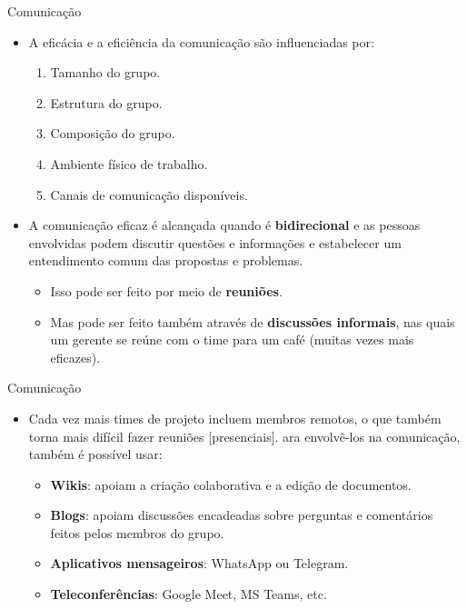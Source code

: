 \documentclass{beamer}
\begin{document}
\begin{frame}{Comunicação}
	\begin{itemize}
		\justifying
		\item<1> A eficácia e a eficiência da comunicação são influenciadas por:
		\begin{enumerate}
			\item<1> Tamanho do grupo.
			\item<1> Estrutura do grupo.
			\item<1> Composição do grupo.
			\item<1> Ambiente físico de trabalho.
			\item<1> Canais de comunicação disponíveis.
		\end{enumerate}
		\item<2> A comunicação eficaz é alcançada quando é \textbf{bidirecional} e as pessoas envolvidas podem discutir questões e informações e estabelecer um entendimento comum das propostas e problemas.
		\begin{itemize}
			\justifying
			\item<2> Isso pode ser feito por meio de \textbf{reuniões}.
			\item<2> Mas pode ser feito também através de \textbf{discussões informais}, nas quais um gerente se reúne com o time para um café (muitas vezes mais eficazes).
		\end{itemize}
	\end{itemize}
\end{frame}

\begin{frame}{Comunicação}
	\begin{itemize}
		\justifying
		\item Cada vez mais times de projeto incluem membros remotos, o que também torna mais difícil fazer reuniões [presenciais]. ara envolvê-los na comunicação, também é possível usar:
		\begin{itemize}
			\justifying
			\item \textbf{Wikis}: apoiam a criação colaborativa e a edição de documentos.
			\item \textbf{Blogs}: apoiam discussões encadeadas sobre perguntas e comentários feitos pelos membros do grupo.
			\item \textbf{Aplicativos mensageiros}: WhatsApp ou Telegram.
			\item \textbf{Teleconferências}: Google Meet, MS Teams, etc.
		\end{itemize}
	\end{itemize}
\end{frame}
\end{document}
